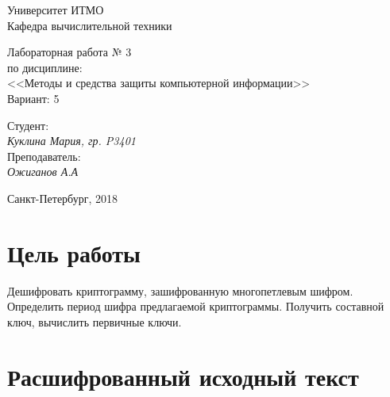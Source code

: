 \documentclass[12pt, a4paper] {ncc}
\begin{document}
\setcounter{figure}{0}
\frenchspacing
\pagestyle{empty}
\begin{center}
                            Университет ИТМО    \\
                        Кафедра вычислительной техники

						Лабораторная работа № 3 \\
				по дисциплине: \\
				<<Методы и средства защиты компьютерной информации>>\\
Вариант: 5
\end{center}
\begin{center}

\end{center}
\begin{flushright}
                                    Студент:\\
                                    {\it Куклина Мария, гр. P3401}\\
                                    Преподаватель: \\
                                    {\it Ожиганов А.А}
\end{flushright}
\begin{center}
                             Санкт-Петербург, 2018
\end{center}
\newpage

\section{Цель работы}

Дешифровать криптограмму, зашифрованную многопетлевым шифром. Определить период шифра предлагаемой
криптограммы. Получить составной ключ, вычислить первичные ключи.


\section{Расшифрованный исходный текст}
\end{document}
